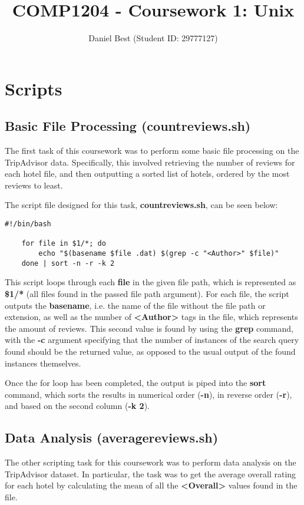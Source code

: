 \documentclass{article}
\title{COMP1204 - Coursework 1: Unix}
\author{Daniel Best (Student ID: 29777127)}
\begin{document}
	
	\maketitle
	
	\newpage
	\section{Scripts}
	
	\subsection{Basic File Processing (countreviews.sh)}
	The first task of this coursework was to perform some basic file processing on the TripAdvisor data. Specifically, this involved retrieving the number of reviews for each hotel file, and then outputting a sorted list of hotels, ordered by the most reviews to least.
	
	The script file designed for this task, \textbf{countreviews.sh}, can be seen below:
	
	\begin{lstlisting}[caption={countreviews.sh}, captionpos=b]
	#!/bin/bash
	
	for file in $1/*; do	
		echo "$(basename $file .dat) $(grep -c "<Author>" $file)"
	done | sort -n -r -k 2
	\end{lstlisting}
	
	This script loops through each \textbf{file} in the given file path, which is represented as \textbf{\$1/*} (all files found in the passed file path argument). For each file, the script outputs the \textbf{basename}, i.e. the name of the file without the file path or extension, as well as the number of \textbf{{\textless}Author\textgreater} tags in the file, which represents the amount of reviews. This second value is found by using the \textbf{grep} command, with the \textbf{-c} argument specifying that the number of instances of the search query found should be the returned value, as opposed to the usual output of the found instances themselves.
	
	Once the for loop has been completed, the output is piped into the \textbf{sort} command, which sorts the results in numerical order (\textbf{-n}), in reverse order (\textbf{-r}), and based on the second column (\textbf{-k 2}).
	
	\newpage
	\subsection{Data Analysis (averagereviews.sh)}
	The other scripting task for this coursework was to perform data analysis on the TripAdvisor dataset. In particular, the task was to get the average overall rating for each hotel by calculating the mean of all the \textbf{{\textless}Overall\textgreater} values found in the file. 
	
\end{document}
